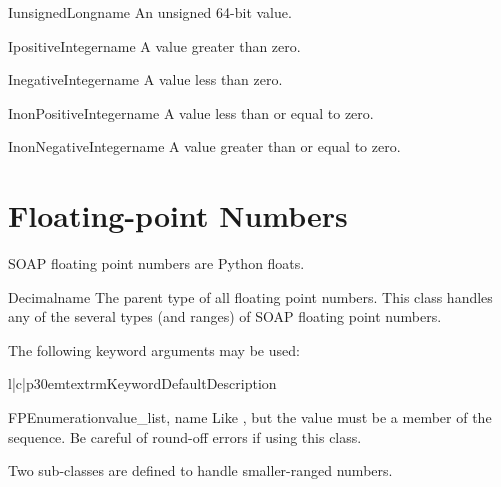 \begin{classdesc}{IunsignedLong}{name}
An unsigned 64-bit value.
\end{classdesc}

\begin{classdesc}{IpositiveInteger}{name}
A value greater than zero.
\end{classdesc}

\begin{classdesc}{InegativeInteger}{name}
A value less than zero.
\end{classdesc}

\begin{classdesc}{InonPositiveInteger}{name}
A value less than or equal to zero.
\end{classdesc}

\begin{classdesc}{InonNegativeInteger}{name}
A value greater than or equal to zero.
\end{classdesc}

\section{Floating-point Numbers}

SOAP floating point numbers are Python floats.

\begin{classdesc}{Decimal}{name}
The parent type of all floating point numbers.
This class handles any of the several types (and ranges) of SOAP
floating point numbers.

The following keyword arguments may be used:

\begin{tableiii}{l|c|p{30em}}{textrm}{Keyword}{Default}{Description}
\end{tableiii}
\end{classdesc}

\begin{classdesc}{FPEnumeration}{value_list, name}
Like , but the value must be a member of
the  sequence.
Be careful of round-off errors if using this class.
\end{classdesc}

Two sub-classes are defined to handle smaller-ranged numbers.

